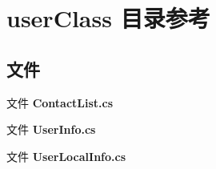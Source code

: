 \section{user\+Class 目录参考}
\label{dir_88e2b66af3166009d84d0b8b0e8fd1e5}
\subsection*{文件}
\begin{DoxyCompactItemize}
\item 
文件 \textbf{ Contact\+List.\+cs}
\item 
文件 \textbf{ User\+Info.\+cs}
\item 
文件 \textbf{ User\+Local\+Info.\+cs}
\end{DoxyCompactItemize}
